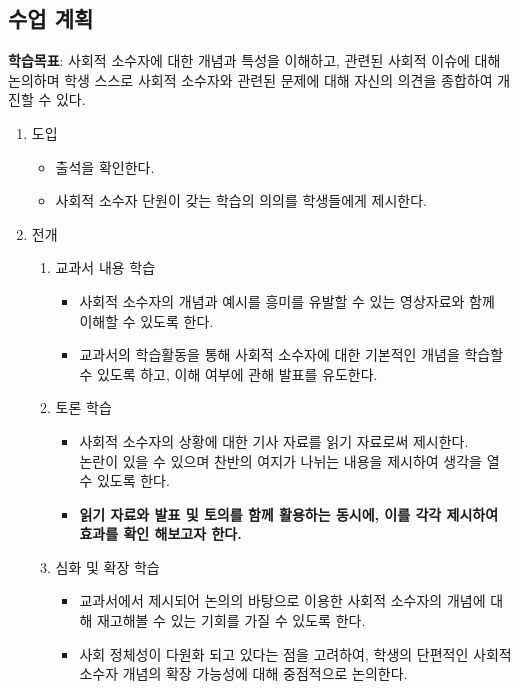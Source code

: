 \documentclass[10pt, a4paper, chapter]{oblivoir}
\begin{document}
        \subsection{수업 계획}
        \textbf{학습목표}: 사회적 소수자에 대한 개념과 특성을 이해하고, 관련된 사회적 이슈에 대해 논의하며 학생 스스로 
        사회적 소수자와 관련된 문제에 대해 자신의 의견을 종합하여 개진할 수 있다. 
        \begin{enumerate}
            \item{도입}
            \begin{itemize}[-]
                \item 출석을 확인한다.
                \item 사회적 소수자 단원이 갖는 학습의 의의를 학생들에게 제시한다.
            \end{itemize}
            \item{전개}
            \begin{enumerate}
                \item 교과서 내용 학습
                \begin{itemize}[-]
                    \item 사회적 소수자의 개념과 예시를 흥미를 유발할 수 있는 영상자료와 함께 이해할 수 있도록 한다. 
                    \item 교과서의 학습활동을 통해 사회적 소수자에 대한 기본적인 개념을 학습할 수 있도록 하고, 이해 여부에 관해 발표를 유도한다.
                \end{itemize}
                \item 토론 학습
                \begin{itemize}[-]
                    \item 사회적 소수자의 상황에 대한 기사 자료를 읽기 자료로써 제시한다. \\ 논란이 있을 수 있으며 찬반의 여지가 나뉘는 내용을 제시하여 생각을 열 수 있도록 한다. 
                    \item \textbf{읽기 자료와 발표 및 토의를 함께 활용하는 동시에, 이를 각각 제시하여 효과를 확인 해보고자 한다.}
                \end{itemize}
                \item 심화 및 확장 학습
                \begin{itemize}[-]
                    \item 교과서에서 제시되어 논의의 바탕으로 이용한 사회적 소수자의 개념에 대해 재고해볼 수 있는 기회를 가질 수 있도록 한다. 
                    \item 사회 정체성이 다원화 되고 있다는 점을 고려하여, 학생의 단편적인 사회적 소수자 개념의 확장 가능성에 대해 중점적으로 논의한다. 

\end{itemize}
\end{enumerate}
\end{enumerate}
\end{document}

